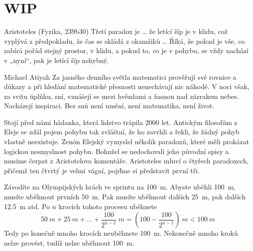 \chapter{WIP}
\begin{chapquote}{Aristoteles (Fyzika, 239b30)}
Třetí paradox je … že letící šíp je v klidu, což vyplývá z předpokladu, že čas se skládá z okamžiků … Říká, že pokud je vše, co zabírá pořád stejný prostor, v klidu, a pokud to, co je v pohybu, se vždy nachází v „nyní“, pak je letící šíp nehybný.  
\end{chapquote}

\begin{chapquote}{Michael Atiyah}
	Za jasného denního světla matematici prověřují své rovnice a důkazy a při hledání matematické přesnosti nenechávají nic náhodě. V noci však, za svitu úplňku, sní, vznášejí se mezi hvězdami a žasnou nad zázrakem nebes. Nacházejí inspiraci. Bez snů není umění, není matematika, není život.
\end{chapquote}

Stojí před námi hádanka, která lidstvo trápila 2000 let. Antickým filosofům z Eleje se zdál pojem pohybu tak zvláštní, že ho zavrhli a řekli, že žádný pohyb vlastně neexistuje. Zenón Elejský vymyslel několik paradoxů, které měli prokázat logickou nesmyslnost pohybu. Bohužel se nedochovali jeho původní spisy a musíme čerpat z Aristotelova komentáře. Aristoteles mluví o čtyřech paradoxech, přičemž ten čtvrtý je velmi vágní, pojďme si představit první tři.

\begin{paradox}\label{paradox:zenon 1}
	Závodíte na Olympijských hrách ve sprintu na \SI{100}{m}. Abyste uběhli \SI{100}{m}, musíte uběhnout prvních \SI{50}{m}. Pak musíte uběhnout dalších \SI{25}{m}, pak dalších \SI{12,5}{m} atd. Po $n$ krocích tohoto procesu uběhnete 
\begin{equation*}
	\SI{50}{m}+\SI{25}{m}+\hdots + \frac{100}{2^{n-1}}\SI{}{m} = \left(100-\frac{100}{2^{n-1}}\right)\SI{}{m} < \SI{100}{m}
\end{equation*}
Tedy po konečně mnoho krocích neuběhnete \SI{100}{m}. Nekonečně mnoho kroků nelze provést, tudíž nelze uběhnout \SI{100}{m}.
\end{paradox}

